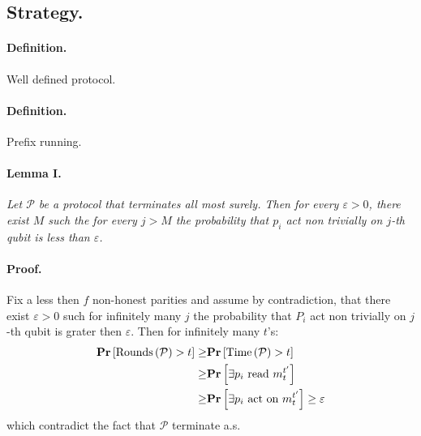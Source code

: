 \documentclass{article}
\begin{document}
\begin{multicols*}{2}
\section{Strategy.}

\paragraph{Definition.} Well defined protocol.

\paragraph{Definition.} Prefix running.  


\paragraph{Lemma I.} \textit{ Let \(\mathcal{P}\) be a protocol that terminates all most surely. Then for every \( \varepsilon > 0 \),  there exist \(M\) such the for every \(j > M\) the probability that \(p_{i}\) act non trivially on \(j\)-th qubit is less than \(\varepsilon\).  }

\paragraph{Proof.} Fix a less then \(f\) non-honest parities and assume by contradiction, that there exist \(\varepsilon >0\) such for infinitely many \(j\) the probability that \(P_{i}\) act non trivially on \(j\)-th qubit is grater then \(\varepsilon\). Then for infinitely many \(t\)'s: 
\begin{equation*}
    \begin{split}
        \mathbf{Pr} \left[ { \text{Rounds}\left( \mathcal{P} \right) > t } \right] \ge & \mathbf{Pr} \left[ { \text{Time}\left( \mathcal{P} \right) > t } \right] \\ \ge & \mathbf{Pr} \left[ { \exists p_{i} \text{ read }  m^{t^\prime}_{t} } \right] \\ \ge &  \mathbf{Pr} \left[ { \exists p_{i} \text{ act on }  m^{t^\prime}_{t} } \right] \ge \varepsilon 
    \end{split}
\end{equation*}
which contradict the fact that \(\mathcal{P}\) terminate a.s. 


\end{multicols*}
\end{document}
